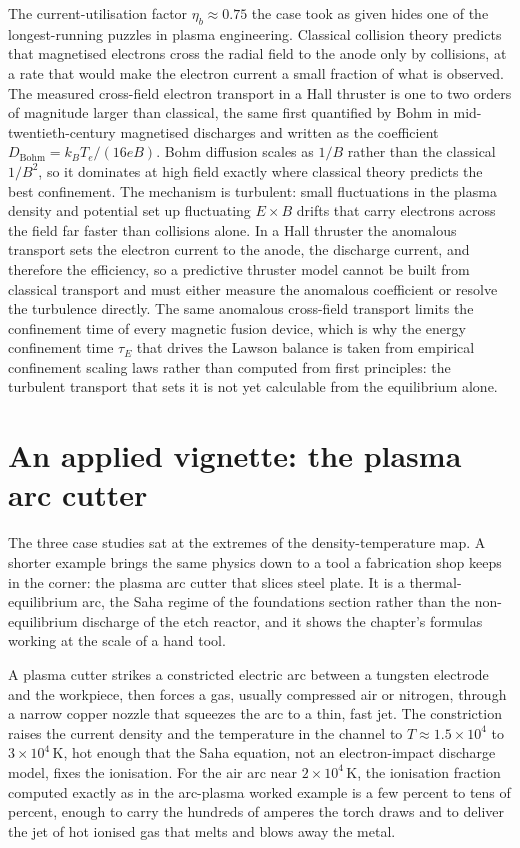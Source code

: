 \begin{mastery}
The current-utilisation factor $\eta_{b}\approx 0.75$ the case took as given
hides one of the longest-running puzzles in plasma engineering. Classical
collision theory predicts that magnetised electrons cross the radial field
to the anode only by collisions, at a rate that would make the electron
current a small fraction of what is observed. The measured cross-field
electron transport in a Hall thruster is one to two orders of magnitude
larger than classical, the same  first
quantified by Bohm in mid-twentieth-century magnetised discharges and written
as the  coefficient $D_{\mathrm{Bohm}} = k_{B}T_{e}/
(16eB)$. Bohm diffusion scales as $1/B$ rather than the classical $1/B^{2}$,
so it dominates at high field exactly where classical theory predicts the
best confinement. The mechanism is turbulent: small fluctuations in the
plasma density and potential set up fluctuating $E\times B$ drifts that carry
electrons across the field far faster than collisions alone. In a Hall
thruster the anomalous transport sets the electron current to the anode, the
discharge current, and therefore the efficiency, so a predictive thruster
model cannot be built from classical transport and must either measure the
anomalous coefficient or resolve the turbulence directly. The same anomalous
cross-field transport limits the confinement time of every magnetic fusion
device, which is why the energy confinement time $\tau_{E}$ that drives the
Lawson balance is taken from empirical confinement scaling laws rather than
computed from first principles: the turbulent transport that sets it is not
yet calculable from the equilibrium alone.
\end{mastery}

\section{An applied vignette: the plasma arc cutter}

The three case studies sat at the extremes of the density-temperature map.
A shorter example brings the same physics down to a tool a fabrication shop
keeps in the corner: the plasma arc cutter that slices steel plate. It is a
thermal-equilibrium arc, the Saha regime of the foundations section rather
than the non-equilibrium discharge of the etch reactor, and it shows the
chapter's formulas working at the scale of a hand tool.

A plasma cutter strikes a constricted electric arc between a tungsten
electrode and the workpiece, then forces a gas, usually compressed air or
nitrogen, through a narrow copper nozzle that squeezes the arc to a thin,
fast jet. The constriction raises the current density and the temperature in
the channel to $T \approx 1.5\times 10^{4}$ to $3\times 10^{4}\,\si{
\kelvin}$, hot enough that the Saha equation, not an electron-impact
discharge model, fixes the ionisation. For the air arc near $2\times
10^{4}\,\si{\kelvin}$, the ionisation fraction computed exactly as in the
arc-plasma worked example is a few percent to tens of percent, enough to
carry the hundreds of amperes the torch draws and to deliver the jet of hot
ionised gas that melts and blows away the metal.

